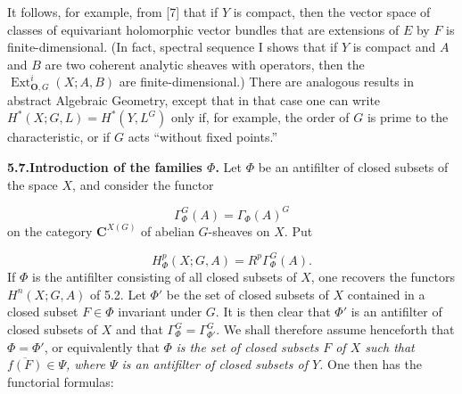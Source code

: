 It follows, for example, from [7] that if $Y$ is compact, then the vector
space of classes of equivariant holomorphic vector bundles that are
extensions of $E$ by $F$ is finite-dimensional. (In fact, spectral sequence I
shows that if $Y$ is compact and $A$ and $B$ are two coherent analytic
sheaves with operators, then the $\operatorname{Ext}_{{\mathbf O},G}^{i}(X;A,B)$ are
finite-dimensional.)
There are analogous results in abstract Algebraic Geometry, except that in
that case one can write $H^*(X;G,L)=H^*(Y,L^G)$ only if, for example, the order
of $G$ is prime to the characteristic, or if $G$ acts ``without fixed
points.''

\textbf{5.7.\quad Introduction of the families $\Phi$.}
Let $\Phi$ be an antifilter of closed subsets of the space $X$, and consider
the functor

\begin{equation}
\Gamma_\Phi^G(A)=\Gamma_\Phi(A)^G
\tag{5.7.1}
\end{equation}
on the category ${\mathbf C}^{X(G)}$ of abelian $G$-sheaves on $X$. Put

\begin{equation}
H_\Phi^p(X;G,A)=R^p\Gamma_\Phi^G(A).
\tag{5.7.2}
\end{equation}
If $\Phi$ is the antifilter consisting of all closed subsets of $X$, one
recovers the functors $H^n(X;G,A)$ of 5.2. Let $\Phi'$ be the set of closed
subsets of $X$ contained in a closed subset $F\in\Phi$ invariant under $G$.
It is then clear that $\Phi'$ is an antifilter of closed subsets of $X$ and
that $\Gamma_\Phi^G=\Gamma_{\Phi'}^G$. We shall therefore assume henceforth
that $\Phi=\Phi'$, or equivalently that $\Phi$ \textit{is the set of closed subsets
$F$ of $X$ such that $\overline{f(F)}\in\Psi$, where $\Psi$ is an antifilter
of closed subsets of $Y$.}
One then has the functorial formulas:

